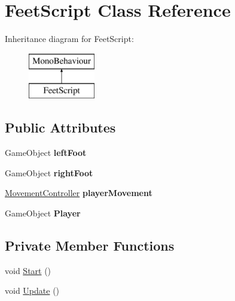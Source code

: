 \hypertarget{class_feet_script}{}\section{Feet\+Script Class Reference}
\label{class_feet_script}
Inheritance diagram for Feet\+Script\+:\begin{figure}[H]
\begin{center}
\leavevmode
\includegraphics[height=2.000000cm]{class_feet_script}
\end{center}
\end{figure}
\subsection*{Public Attributes}
\begin{DoxyCompactItemize}
\item 
\mbox{\label{class_feet_script_a0d1a5c93d34c3dd91d00db6414401237}} 
Game\+Object {\bfseries left\+Foot}
\item 
\mbox{\label{class_feet_script_a0aeef3addee2e12f72b1d26b83c22896}} 
Game\+Object {\bfseries right\+Foot}
\item 
\mbox{\label{class_feet_script_ae3b5e35d0542b87d369cfa4add5914af}} 
\hyperlink{class_movement_controller}{Movement\+Controller} {\bfseries player\+Movement}
\item 
\mbox{\label{class_feet_script_a8bf099ec946d371881d0ac2f5db67449}} 
Game\+Object {\bfseries Player}
\end{DoxyCompactItemize}
\subsection*{Private Member Functions}
\begin{DoxyCompactItemize}
\item 
void \hyperlink{class_feet_script_a0c90eae003cb2d13993b7e90ca9f968c}{Start} ()
\item 
void \hyperlink{class_feet_script_acd0106a8d0223acafa6a30b985d753a0}{Update} ()
\end{DoxyCompactItemize}
